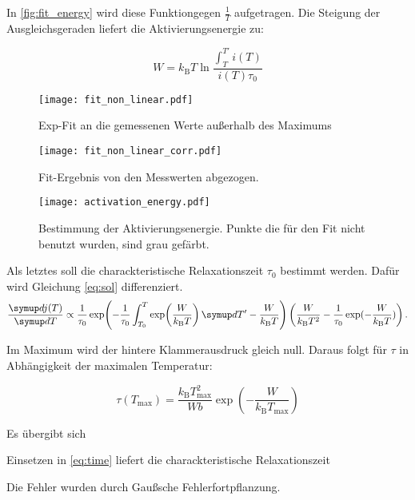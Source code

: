 In \autoref{fig:fit_energy} wird diese Funktiongegen $\frac{1}{T}$ aufgetragen. Die Steigung der Ausgleichsgeraden liefert die Aktivierungsenergie zu:
\begin{equation}
  
\end{equation}

\begin{equation}
  W = k_\text{B} T \ln \frac{\int_T^{T'} i(T)}{ i(T) \tau_0}
  \label{eq:final}
\end{equation}

\begin{figure}
  \centering
  \texttt{[image: fit\_non\_linear.pdf]}
  \caption{Exp-Fit an die gemessenen Werte außerhalb des Maximums}
  \label{fig:fit_non_linear}
\end{figure}

\begin{figure}
  \centering
  \texttt{[image: fit\_non\_linear\_corr.pdf]}
  \caption{Fit-Ergebnis von den Messwerten abgezogen.}
  \label{fig:fit_non_linear_corr}
\end{figure}


\begin{figure}
  \centering
  \texttt{[image: activation\_energy.pdf]}
  \caption{Bestimmung der Aktivierungsenergie. Punkte die für den Fit nicht benutzt wurden, sind grau gefärbt.}
  \label{fig:fit_energy}
\end{figure}


Als letztes soll die charackteristische Relaxationszeit $\tau_0$ bestimmt werden. Dafür wird Gleichung \eqref{eq:sol} differenziert.
\begin{equation}
  \label{eq:crazy}
  \dd{j(T)}{T} \propto
    \frac{1}{\tau_0}
    \exp\!\left(
      -\frac{1}{\tau_0} \int_{T_0}^{T} \exp\! \left( \frac{W}{k_\text{B} T} \right)  \dif{T'} - \frac{W}{k_\text{B} T}
    \right) \left( \frac{W}{k_\text{B} T^2} -   \frac{1}{\tau_0}\exp(-\frac{W}{k_\text{B} T}) \right).
\end{equation}

Im Maximum wird der hintere Klammerausdruck gleich null. Daraus folgt für $\tau$ in Abhängigkeit der maximalen Temperatur:

\begin{equation}
  \label{eq:tau}
  \tau(T_\text{max}) = \frac{k_\text{B} T_\text{max}^2}{W b} \exp\left(-\frac{W}{k_\text{B} T_\text{max}} \right)
\end{equation}

Es übergibt sich
\begin{equation}
  
\end{equation}

Einsetzen in \eqref{eq:time} liefert die  charackteristische Relaxationszeit
\begin{equation}
  
\end{equation}

Die Fehler wurden durch Gaußsche Fehlerfortpflanzung.
